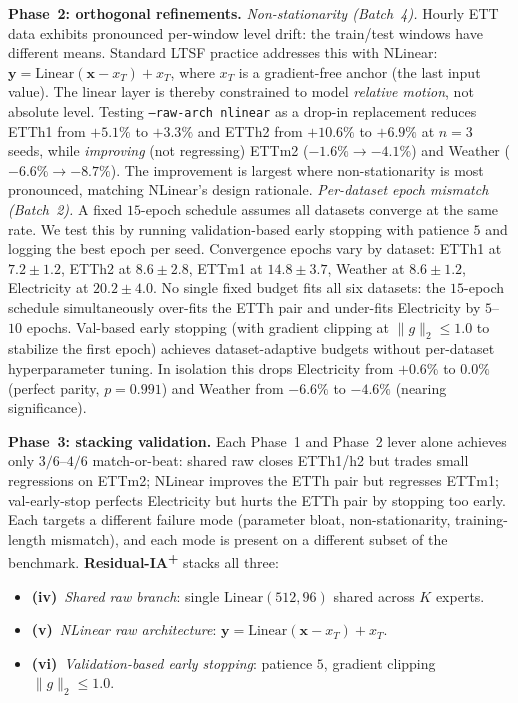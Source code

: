 \documentclass{article}
\begin{document}
\textbf{Phase~2: orthogonal refinements.}
\emph{Non-stationarity (Batch~4).} Hourly ETT data exhibits pronounced per-window level drift: the train/test windows have different means. Standard LTSF practice addresses this with NLinear: $\mathbf{y} = \text{Linear}(\mathbf{x} - x_T) + x_T$, where $x_T$ is a gradient-free anchor (the last input value). The linear layer is thereby constrained to model \emph{relative motion}, not absolute level. Testing \texttt{--raw-arch nlinear} as a drop-in replacement reduces ETTh1 from $+5.1\%$ to $+3.3\%$ and ETTh2 from $+10.6\%$ to $+6.9\%$ at $n{=}3$ seeds, while \emph{improving} (not regressing) ETTm2 ($-1.6\% \to -4.1\%$) and Weather ($-6.6\% \to -8.7\%$). The improvement is largest where non-stationarity is most pronounced, matching NLinear's design rationale.
\emph{Per-dataset epoch mismatch (Batch~2).} A fixed $15$-epoch schedule assumes all datasets converge at the same rate. We test this by running validation-based early stopping with patience $5$ and logging the best epoch per seed. Convergence epochs vary by dataset: ETTh1 at $7.2{\pm}1.2$, ETTh2 at $8.6{\pm}2.8$, ETTm1 at $14.8{\pm}3.7$, Weather at $8.6{\pm}1.2$, Electricity at $20.2{\pm}4.0$. No single fixed budget fits all six datasets: the $15$-epoch schedule simultaneously over-fits the ETTh pair and under-fits Electricity by $5$--$10$ epochs. Val-based early stopping (with gradient clipping at $\lVert g \rVert_2 \leq 1.0$ to stabilize the first epoch) achieves dataset-adaptive budgets without per-dataset hyperparameter tuning. In isolation this drops Electricity from $+0.6\%$ to $0.0\%$ (perfect parity, $p{=}0.991$) and Weather from $-6.6\%$ to $-4.6\%$ (nearing significance).

\textbf{Phase~3: stacking validation.}
Each Phase~1 and Phase~2 lever alone achieves only $3/6$--$4/6$ match-or-beat: shared raw closes ETTh1/h2 but trades small regressions on ETTm2; NLinear improves the ETTh pair but regresses ETTm1; val-early-stop perfects Electricity but hurts the ETTh pair by stopping too early. Each targets a different failure mode (parameter bloat, non-stationarity, training-length mismatch), and each mode is present on a different subset of the benchmark. \textbf{Residual-IA\textsuperscript{+}} stacks all three:

\begin{itemize}
\item \textbf{(iv)}~\emph{Shared raw branch}: single $\text{Linear}(512, 96)$ shared across $K$ experts.
\item \textbf{(v)}~\emph{NLinear raw architecture}: $\mathbf{y} = \text{Linear}(\mathbf{x} - x_T) + x_T$.
\item \textbf{(vi)}~\emph{Validation-based early stopping}: patience $5$, gradient clipping $\lVert g \rVert_2 \leq 1.0$.
\end{itemize}
\end{document}
